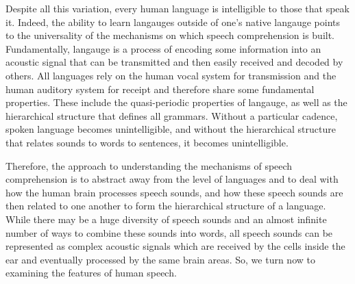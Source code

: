 \documentclass[titlepage]{article}
\begin{document}
  Despite all this variation, every human language is intelligible to those that speak it.
  Indeed, the ability to learn langauges outside of one's native langauge points to the
  universality of the mechanisms on which speech comprehension is built. Fundamentally,
  langauge is a process of encoding some information into an acoustic signal that can
  be transmitted and then easily received and decoded by others. All languages rely on
  the human vocal system for transmission and the human auditory system for receipt
  and therefore share some fundamental properties. These include the quasi-periodic
  properties of langauge, as well as the hierarchical structure that defines all
  grammars. Without a particular cadence, spoken language becomes unintelligible,
  and without the hierarchical structure that relates sounds to words to sentences,
  it becomes unintelligible.

  Therefore, the approach to understanding the mechanisms of speech comprehension
  is to abstract away from the level of languages and to deal with how the human
  brain processes speech sounds, and how these speech sounds are then related to one
  another to form the hierarchical structure of a language.
  While there may be a huge diversity of speech sounds and an almost infinite number of ways
  to combine these sounds into words, all speech sounds can be represented as
  complex acoustic signals which are received by the cells inside the ear
  and eventually processed by the same brain areas. So, we turn now to examining the
  features of human speech.
\end{document}
